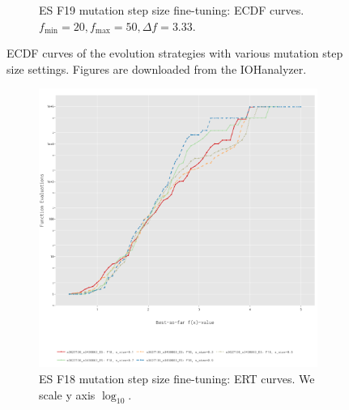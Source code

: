 \documentclass{article}
\begin{document}
\begin{figure}[!ht]
\begin{subfigure}[h]{0.95\linewidth}
        \caption{ES F19 mutation step size fine-tuning: ECDF curves. $f_{\min} = 20, f_{\max} = 50, \Delta f = 3.33$.}
    \end{subfigure}
    \caption{ECDF curves of the evolution strategies with various mutation step size settings. Figures are downloaded from the IOHanalyzer.}
    \label{fig:experi-es-ssize-ecdf}
\end{figure}

\begin{figure}[!ht]
    \begin{subfigure}[h]{0.95\linewidth}
        \includegraphics[width=\linewidth]{es/f18/ERT18ss.png}
        \caption{ES F18 mutation step size fine-tuning: ERT curves. We scale y axis $\log_{10}$.}
    \end{subfigure}
    \hfill
    \begin{subfigure}[h]{0.95\linewidth}

\end{subfigure}
\end{figure}
\end{document}
